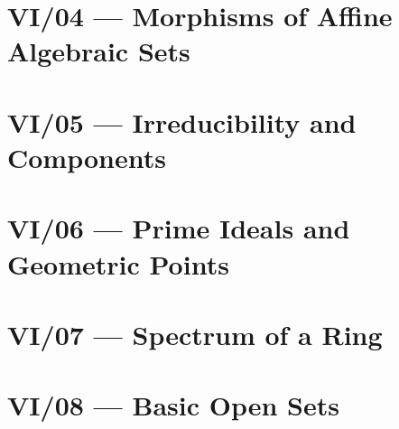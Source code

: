 \section{VI/04 --- Morphisms of Affine Algebraic Sets}




\section{VI/05 --- Irreducibility and Components}




\section{VI/06 --- Prime Ideals and Geometric Points}




\section{VI/07 --- Spectrum of a Ring}









\section{VI/08 --- Basic Open Sets}


